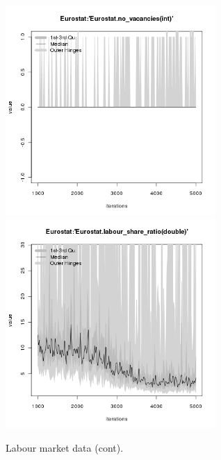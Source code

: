 \begin{figure}[H!]
\centering\leavevmode
\begin{minipage}{17cm}
\centering\leavevmode
\includegraphics[width=8cm]{./png/tax_0.10/Eurostat-no_vacancies.png}
\includegraphics[width=8cm]{./png/tax_0.10/Eurostat-labour_share_ratio.png}
\end{minipage}
\caption{Labour market data (cont).}
\label{Figure: Labour Market 2}
\end{figure}

\clearpage


